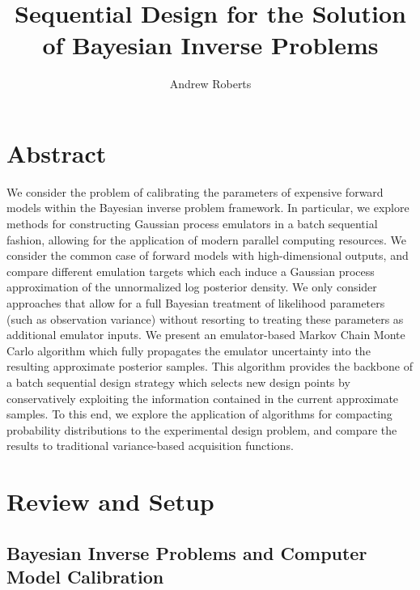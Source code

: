 \documentclass[12pt]{article}
\title{Sequential Design for the Solution of Bayesian Inverse Problems}
\author{Andrew Roberts}
\begin{document}
\maketitle
\tableofcontents
\newpage

\section{Abstract}
We consider the problem of calibrating the parameters of expensive forward models within the Bayesian inverse problem framework. In particular, we 
explore methods for constructing Gaussian process emulators in a batch sequential fashion, allowing for the application of modern parallel computing 
resources. We consider the common case of forward models with high-dimensional outputs, and compare different emulation targets which each induce 
a Gaussian process approximation of the unnormalized log posterior density. We only consider approaches that allow 
for a full Bayesian treatment of likelihood parameters (such as observation variance) without resorting to treating these parameters as additional emulator
inputs. We present an emulator-based Markov Chain Monte Carlo algorithm which 
fully propagates the emulator uncertainty into the resulting approximate posterior samples. This algorithm provides the backbone of a batch sequential 
design strategy which selects new design points by conservatively exploiting the information contained in the current approximate samples. To this end, we 
explore the application of algorithms for compacting probability distributions to the experimental design problem, and compare the results to traditional 
variance-based acquisition functions. 


\section{Review and Setup}

\subsection{Bayesian Inverse Problems and Computer Model Calibration}
\end{document}
